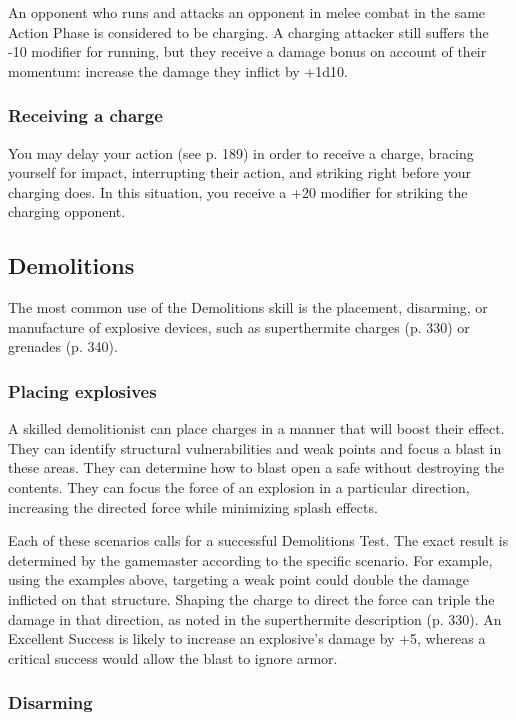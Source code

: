 An opponent who runs and attacks an opponent in melee combat in the same Action Phase is considered to be charging. A charging attacker still suffers the -10 modifier for running, but they receive a damage bonus on account of their momentum: increase the damage they inflict by +1d10.

\subsubsection{Receiving a charge}

You may delay your action (see p. 189) in order to receive a charge, bracing yourself for impact, interrupting their action, and striking right before your charging does. In this situation, you receive a +20 modifier for striking the charging opponent.


\subsection{Demolitions}
\label{sec:demolitions}

The most common use of the Demolitions skill is the placement, disarming, or manufacture of explosive devices, such as superthermite charges (p. 330) or grenades (p. 340).

\subsubsection{Placing explosives}

A skilled demolitionist can place charges in a manner that will boost their effect. They can identify structural vulnerabilities and weak points and focus a blast in these areas. They can determine how to blast open a safe without destroying the contents. They can focus the force of an explosion in a particular direction, increasing the directed force while minimizing splash effects.

Each of these scenarios calls for a successful Demolitions Test. The exact result is determined by the gamemaster according to the specific scenario. For example, using the examples above, targeting a weak point could double the damage inflicted on that structure. Shaping the charge to direct the force can triple the damage in that direction, as noted in the superthermite description (p. 330). An Excellent Success is likely to increase an explosive’s damage by +5, whereas a critical success would allow the blast to ignore armor.

\subsubsection{Disarming}

